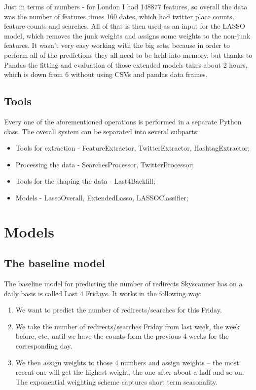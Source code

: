 \documentclass[minf,frontabs,twoside,singlespacing,parskip]{infthesis}
\begin{document}
Just in terms of numbers - for London I had 148877 features, so overall the data was the number of features times 160 dates, which had twitter place counts, feature counts and searches. All of that is then used as an input for the LASSO model, which removes the junk weights and assigns some weights to the non-junk features. It wasn't very easy working with the big sets, because in order to perform all of the predictions they all need to be held into memory, but thanks to Pandas \cite{pandas} the fitting and evaluation of those extended models takes about 2 hours, which is down from 6 without using CSVs and pandas data frames.


\section{Tools}


Every one of the aforementioned operations is performed in a separate Python class. The overall system can be separated into several subparts:
\begin{itemize}
\item Tools for extraction - FeatureExtractor, TwitterExtractor, HashtagExtractor;
\item Processing the data - SearchesProcessor, TwitterProcessor;
\item Tools for the shaping the data - Last4Backfill;
\item Models - LassoOverall, ExtendedLasso, LASSOClassifier;
\end{itemize}



\chapter{Models}
\label{chap:model}

\section{The baseline model}
\label{sec:baseline}

The baseline model for predicting the number of redirects Skyscanner has on a daily basis is called Last 4 Fridays. 
It works in the following way:
\begin{enumerate}
\item We want to predict the number of redirects/searches for this Friday.
\item We take the number of redirects/searches Friday from last week, the week before, etc, until we have the counts form the previous 4 weeks for the corresponding day.
\item We then assign weights to those 4 numbers and assign weights -- the most recent one will get the highest weight, the one after about a half and so on. The exponential weighting scheme captures short term seasonality.
\end{enumerate}
\end{document}
